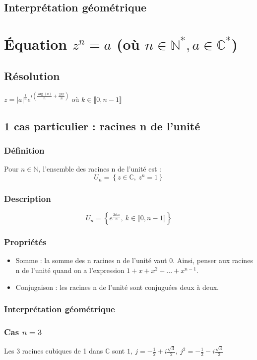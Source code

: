 \documentclass[12pt,a4paper,french]{book}
\begin{document}
		\subsection{Interprétation géométrique}
	\section{Équation $z^{n}=a$ (où $n\in \mathbb{N}^{\ast},a\in \mathbb{C}^{\ast}$)}
		\subsection{Résolution}
		$z = \left|a\right|^{\frac{1}{n}} e^{i\left(\frac{\operatorname{arg}(a)}{n} + \frac{2k\pi}{n}\right)}$ où $k \in  \llbracket 0,n-1 \rrbracket$
		\subsection{1 cas particulier : racines n de l'unité}
			\subsubsection{Définition}
			Pour $n \in \mathbb{N}$, l'ensemble des racines n de l'unité est :
			\[U_n = \left\{z \in \mathbb{C}, \ z^n = 1\right\}\]
			\subsubsection{Description}
			\[U_n = \left\{e^{\frac{2ik\pi}{n}},\ k \in \llbracket 0,n-1 \rrbracket \right\}\]
			\subsubsection{Propriétés}
			\begin{itemize}
				\item Somme : la somme des n racines n de l'unité vaut 0. Ainsi, penser aux racines n de l'unité quand on a l'expression $1 + x + x^2 + ... + x^{n-1}$.
				\item Conjugaison : les racines n de l'unité sont conjuguées deux à deux.
			\end{itemize}
			
			\subsubsection{Interprétation géométrique}
			\subsubsection{Cas $n=3$}
			Les 3 racines cubiques de 1 dans $\mathbb{C}$ sont $1,\ j = -\frac{1}{2}+i\frac{\sqrt{3}}{2},\ j^2 = -\frac{1}{2}-i\frac{\sqrt{3}}{2}$
			
\end{document}
